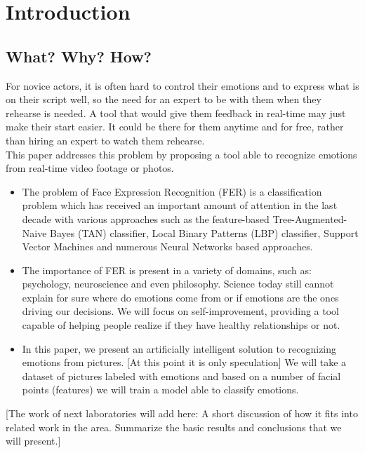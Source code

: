 \documentclass[runningheads,a4paper,11pt]{report}
\begin{document}
\newpage



 


\chapter{Introduction}
\label{chapter:introduction}

\section{What? Why? How?}
\label{section:what}

For novice actors, it is often hard to control their emotions and to express what is on their script well, so the need for an expert to be with them when they rehearse is needed. A tool that would give them feedback in real-time may just make their start easier. It could be there for them anytime and for free, rather than hiring an expert to watch them rehearse.\\
This paper addresses this problem by proposing a tool able to recognize emotions from real-time video footage or photos.

\begin{itemize}
	\item The problem of Face Expression Recognition (FER) is a classification problem which has received an important amount of attention in the last decade with various approaches such as the feature-based Tree-Augmented-Naive Bayes (TAN) classifier, Local Binary Patterns (LBP) classifier, Support Vector Machines and numerous Neural Networks based approaches.
	\item The importance of FER is present in a variety of domains, such as: psychology, neuroscience and even philosophy. Science today still cannot explain for sure where do emotions come from or if emotions are the ones driving our decisions. We will focus on self-improvement, providing a tool capable of helping people realize if they have healthy relationships or not.
	\item In this paper, we present an artificially intelligent solution to recognizing emotions from pictures. [At this point it is only speculation] We will take a dataset of pictures labeled with emotions and based on a number of facial points (features) we will train a model able to classify emotions.
\end{itemize}

[The work of next laboratories will add here: 
A short discussion of how it fits into related work in the area. Summarize the basic results and conclusions that we will present.]
\end{document}

